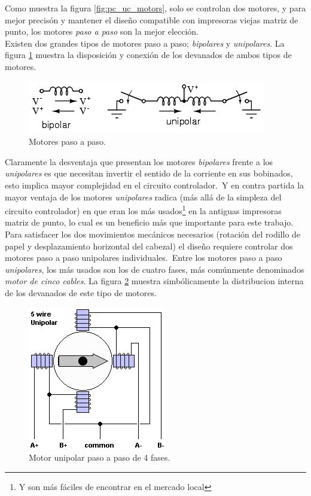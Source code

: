 Como muestra la figura \ref{fig:pc_uc_motors}, solo se controlan dos motores, y
para mejor precis\'on y mantener el dise\~no compatible con impresoras viejas
matriz de punto, los motores \emph{paso a paso} son la mejor elecci\'on.\\

Existen dos grandes tipos de motores paso a paso; \emph{bipolares} y
\emph{unipolares}. La figura \ref{fig:stepper_motors} muestra la disposici\'on
y conexi\'on de los devanados de ambos tipos de motores. 


\begin{figure}[htp]
\centering
\includegraphics[scale=0.7]{./img/02440.png}
\caption{Motores paso a paso.}
\label{fig:stepper_motors}
\end{figure}

Claramente la desventaja que presentan los motores \emph{bipolares} frente a
los \emph{unipolares} es que necesitan invertir el sentido de la corriente en
sus bobinados, esto implica mayor complejidad en el circuito controlador.\
Y en contra partida la mayor ventaja de los motores \emph{unipolares} radica
(m\'as all\'a de la simpleza del circuito controlador) en que eran los m\'as
usados\footnote{Y son m\'as f\'aciles de encontrar en el mercado local} en la
antiguas impresoras matriz de punto, lo cual es un beneficio m\'as que
importante
para este trabajo.\\

Para satisfacer los dos movimientos mec\'anicos necesarios (rotaci\'on del
rodillo de papel y desplazamiento horizontal del cabezal) el dise\~no requiere
controlar dos motores paso a paso unipolares individuales.\
Entre los motores paso a paso \emph{unipolares}, los m\'as usados son los de
cuatro fases, m\'as com\'unmente denominados \emph{motor de cinco cables}. La
figura \ref{fig:stepper_motor_5_wire} muestra simb\'olicamente la distribucion
interna de los devanados de este tipo de motores.

\begin{figure}[htp]
\centering
\includegraphics[scale=0.5]{./img/5wire.png}
\caption{Motor unipolar paso a paso de 4 fases.}
\label{fig:stepper_motor_5_wire}
\end{figure}

